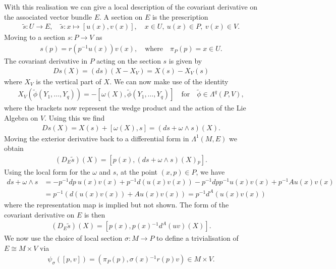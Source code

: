 \documentclass[10pt]{report}
\theoremstyle{definition}
\begin{document}
With this realisation we can give a local description of the covariant derivative on the associated vector bundle $E$. A section on $E$ is the prescription 
\begin{align}
    \tilde{s} : U \rightarrow E, \quad \tilde{s} : x \mapsto [u(x),v(x)], \quad x \in U,\ u(x) \in P,\ v(x) \in V.
\end{align} 
Moving to a section $s : P \rightarrow V$ as 
\begin{align}
    s(p) = r(p^{-1} u(x) ) v(x), \quad \textrm{where} \quad \pi_P(p) = x \in U.
\end{align}
The covariant derivative in $P$ acting on the section $s$ is given by
\begin{align}
    Ds(X) = (ds)(X-X_V) = X(s) - X_V(s)
\end{align}
where $X_V$ is the vertical part of $X$. We can now make use of the identity
\begin{align}
    X_V(\tilde{\phi}(Y_1,\ldots,Y_q)) = -[\omega(X),\tilde{\phi}(Y_1,\ldots,Y_q)] \quad \textrm{for} \quad \tilde{\phi} \in \Lambda^q(P,V),
\end{align}
where the brackets now represent the wedge product and the action of the Lie Algebra on $V$. Using this we find 
\begin{align}
    Ds(X) = X(s) + [\omega(X),s] = (d s + \omega \wedge s)(X).
\end{align}
Moving the exterior derivative back to a differential form in $\Lambda^1(M,E)$ we obtain
\begin{align}
    (D_E \tilde{s})(X) = [p(x),(d s + \omega \wedge s)(X){}_p].
\end{align}
Using the local form for the $\omega$ and $s$, at the point $(x,p) \in P$, we have
\begin{align}
    d s + \omega \wedge s & = -p^{-1} dp\ u(x) v(x) + p^{-1} d(u(x)v(x)) - p^{-1} dp p^{-1} u(x) v(x) + p^{-1} A u(x) v(x) \nonumber \\ & = p^{-1} (d(u(x)v(x)) + A u(x)v(x)) = p^{-1} d^A(u(x)v(x))
\end{align}
where the representation map is implied but not shown. The form of the covariant derivative on $E$ is  then
\begin{align}
    (D_E \tilde{s})(X) = [p(x), p(x){}^{-1}d^A(uv)(X)].
\end{align}
We now use the choice of local section $\sigma : M \rightarrow P$ to define a trivialisation of $E \cong M \times V$ via 
\begin{align}
    \psi_\sigma([p,v]) = (\pi_P(p), \sigma(x){}^{-1} r(p) v) \in M \times V.
\end{align}
\end{document}
